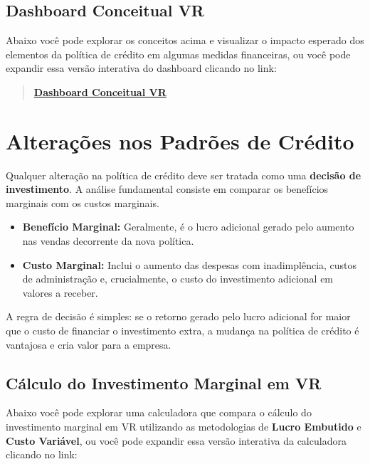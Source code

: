 \documentclass[
  a4paper,
]{book}
\providecommand{\tightlist}{%
  \setlength{\itemsep}{0pt}\setlength{\parskip}{0pt}}\usepackage{longtable,booktabs,array}
\begin{document}
\subsection{Dashboard Conceitual VR}\label{dashboard-conceitual-vr}

Abaixo você pode explorar os conceitos acima e visualizar o impacto
esperado dos elementos da política de crédito em algumas medidas
financeiras, ou você pode expandir essa versão interativa do dashboard
clicando no link:

\begin{quote}
\href{resources/04-intro.html}{\textbf{Dashboard Conceitual VR}}
\end{quote}

\section{Alterações nos Padrões de
Crédito}\label{alterauxe7uxf5es-nos-padruxf5es-de-cruxe9dito}

Qualquer alteração na política de crédito deve ser tratada como uma
\textbf{decisão de investimento}. A análise fundamental consiste em
comparar os benefícios marginais com os custos marginais.

\begin{itemize}
\tightlist
\item
  \textbf{Benefício Marginal:} Geralmente, é o lucro adicional gerado
  pelo aumento nas vendas decorrente da nova política.
\item
  \textbf{Custo Marginal:} Inclui o aumento das despesas com
  inadimplência, custos de administração e, crucialmente, o custo do
  investimento adicional em valores a receber.
\end{itemize}

A regra de decisão é simples: se o retorno gerado pelo lucro adicional
for maior que o custo de financiar o investimento extra, a mudança na
política de crédito é vantajosa e cria valor para a empresa.

\subsection{Cálculo do Investimento Marginal em
VR}\label{cuxe1lculo-do-investimento-marginal-em-vr}

Abaixo você pode explorar uma calculadora que compara o cálculo do
investimento marginal em VR utilizando as metodologias de \textbf{Lucro
Embutido} e \textbf{Custo Variável}, ou você pode expandir essa versão
interativa da calculadora clicando no link:
\end{document}
